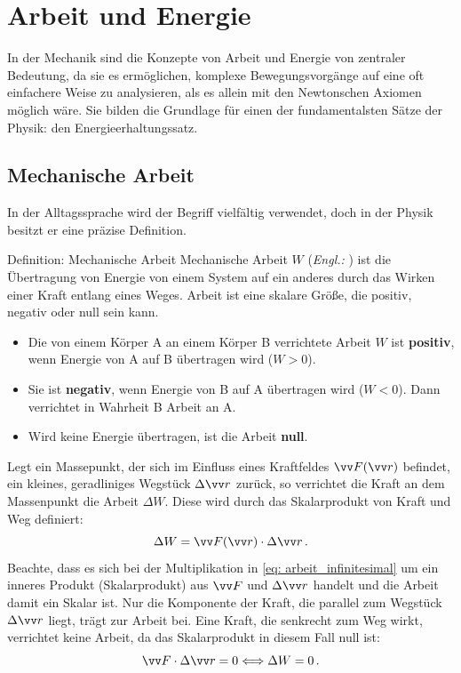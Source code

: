 \chapter{Arbeit und Energie}\label{chap: Arbeit_und_Energie}
In der Mechanik sind die Konzepte von Arbeit und Energie von zentraler Bedeutung, da sie es ermöglichen, komplexe Bewegungsvorgänge auf eine oft einfachere Weise zu analysieren, als es allein mit den Newtonschen Axiomen möglich wäre. Sie bilden die Grundlage für einen der fundamentalsten Sätze der Physik: den Energieerhaltungssatz.

\section{Mechanische Arbeit}\label{sec: mechanische_arbeit}
In der Alltagssprache wird der Begriff  vielfältig verwendet, doch in der Physik besitzt er eine präzise Definition.

\begin{rememberbox}[]{Definition: Mechanische Arbeit}
    Mechanische Arbeit $W$ (\textit{Engl.:} ) ist die Übertragung von Energie von einem System auf ein anderes durch das Wirken einer Kraft entlang eines Weges. Arbeit ist eine skalare Größe, die positiv, negativ oder null sein kann. 
    \begin{itemize}[itemsep=1pt]
        \item Die von einem Körper A an einem Körper B verrichtete Arbeit $W$ ist \textbf{positiv}, wenn Energie von A auf B übertragen wird ($W > 0$).
        \item Sie ist \textbf{negativ}, wenn Energie von B auf A übertragen wird ($W < 0$). Dann verrichtet in Wahrheit B Arbeit an A. 
        \item Wird keine Energie übertragen, ist die Arbeit \textbf{null}. 
    \end{itemize}
\end{rememberbox}

Legt ein Massepunkt, der sich im Einfluss eines Kraftfeldes $\ivec{F}(\ivec{r})$ befindet, ein kleines, geradliniges Wegstück $\Delta\ivec{r}$ zurück, so verrichtet die Kraft an dem Massenpunkt die Arbeit $\Delta W$. Diese wird durch das Skalarprodukt von Kraft und Weg definiert: 
\begin{equation}\label{eq: arbeit_infinitesimal}
    \Delta W = \ivec{F}(\ivec{r}) \cdot \Delta\ivec{r} \mDot
\end{equation}
Beachte, dass es sich bei der Multiplikation in \cref{eq: arbeit_infinitesimal} um ein inneres Produkt (Skalarprodukt) aus $\ivec{F}$ und $\Delta \ivec{r}$ handelt und die Arbeit damit ein Skalar ist. Nur die Komponente der Kraft, die parallel zum Wegstück $\Delta\ivec{r}$ liegt, trägt zur Arbeit bei. Eine Kraft, die senkrecht zum Weg wirkt, verrichtet keine Arbeit, da das Skalarprodukt in diesem Fall null ist: 
\begin{equation}
    \ivec{F} \cdot \Delta \ivec{r} = 0 \Longleftrightarrow \Delta W = 0 \mDot
\end{equation}

